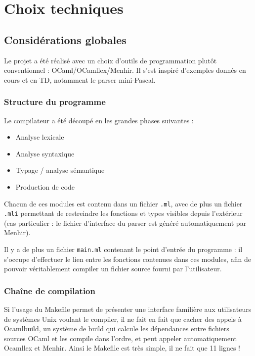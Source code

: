 \documentclass[a4paper, 11pt]{article}
\begin{document}
\section{Choix techniques}

\subsection{Considérations globales}

Le projet a été réalisé avec un choix d'outils de programmation plutôt conventionnel :
OCaml/OCamllex/Menhir. Il s'est inspiré d'exemples donnés en cours et en TD, notamment
le parser mini-Pascal.

\subsubsection{Structure du programme}

Le compilateur a été découpé en les grandes phases suivantes :
\begin{itemize}
\item Analyse lexicale
\item Analyse syntaxique
\item Typage / analyse sémantique
\item Production de code
\end{itemize}

Chacun de ces modules est contenu dans un fichier \texttt{.ml}, avec de plus
un fichier \texttt{.mli} permettant de restreindre les fonctions et types
visibles depuis l'extérieur (cas particulier : le fichier d'interface du parser
est généré automatiquement par Menhir).

Il y a de plus un fichier \texttt{main.ml} contenant le point d'entrée du programme :
il s'occupe d'effectuer le lien entre les fonctions contenues dans ces modules,
afin de pouvoir véritablement compiler un fichier source fourni par l'utilisateur.

\subsubsection{Chaîne de compilation}

Si l'usage du Makefile permet de présenter une interface familière aux
utilisateurs de systèmes Unix voulant le compiler, il ne fait en fait que cacher
des appels à Ocamlbuild, un système de build qui calcule les dépendances
entre fichiers sources OCaml et les compile dans l'ordre, et peut appeler automatiquement
Ocamllex et Menhir. Ainsi le Makefile est très simple, il ne fait que 11 lignes !
\end{document}
